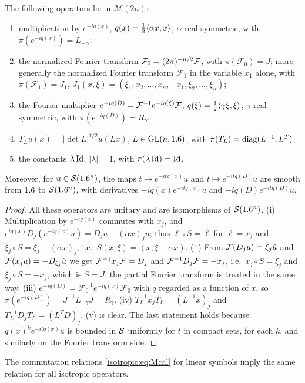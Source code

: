 \begin{lemma}\label{isotropic:lem:Mcal-examples}
The following operators lie in $\mathcal M(2n)$:
\begin{enumerate}[label=\textup{(\roman*)}]
\item multiplication by $e^{-iq(x)}$, $q(x)=\frac12\langle \alpha x, x\rangle$, $\alpha$
  real symmetric, with $\pi(e^{-iq(x)})=L_{-\alpha}$;
\item the normalized Fourier transform $\mathcal F_0=(2\pi)^{-n/2}\mathcal{F}$, with
  $\pi(\mathcal F_0)=J$; more generally the normalized Fourier transform
  $\mathcal F_1$ in the variable $x_1$ alone, with
  $\pi(\mathcal F_1)=J_1$, $J_1(x,\xi)=(\xi_1,x_2,\dots,x_n,-x_1,\xi_2,\dots,\xi_n)$;
\item the Fourier multiplier $e^{-iq(D)}=\mathcal{F}^{-1}e^{-iq(\xi)}\mathcal{F}$,
  $q(\xi)=\frac12\langle \gamma\xi, \xi\rangle$, $\gamma$ real symmetric, with
  $\pi(e^{-iq(D)})=R_\gamma$;
\item $T_Lu(x)=|\det L|^{1/2}u(Lx)$, $L\in\operatorname{GL}(n,1.6)$, with
  $\pi(T_L)=\operatorname{diag}(L^{-1},L^T)$;
\item the constants $\lambda\operatorname{Id}$, $|\lambda|=1$, with $\pi(\lambda\operatorname{Id})=\operatorname{Id}$.
\end{enumerate}
Moreover, for $u\in\mathcal{S}(1.6^n)$, the maps $t\mapsto e^{-itq(x)}u$ and
$t\mapsto e^{-itq(D)}u$ are smooth from $1.6$ to $\mathcal{S}(1.6^n)$, with derivatives
$-iq(x)e^{-itq(x)}u$ and $-iq(D)e^{-itq(D)}u$.
\end{lemma}
\begin{proof}
All these operators are unitary and are isomorphisms of $\mathcal{S}(1.6^n)$. (i)
Multiplication by $e^{-iq(x)}$ commutes with $x_j$, and
$e^{iq(x)}D_j(e^{-iq(x)}u)=D_ju-(\alpha x)_ju$; thus $\ell\circ S=\ell$ for
$\ell=x_j$ and $\xi_j\circ S=\xi_j-(\alpha x)_j$, i.e.\ $S(x,\xi)=(x,\xi-\alpha x)$.
(ii) From $\mathcal{F}(D_ju)=\xi_j\hat u$ and $\mathcal{F}(x_ju)=-D_{\xi_j}\hat u$ we get
$\mathcal{F}^{-1}x_j\mathcal{F}=D_j$ and $\mathcal{F}^{-1}D_j\mathcal{F}=-x_j$, i.e.\ $x_j\circ S=\xi_j$ and
$\xi_j\circ S=-x_j$, which is $S=J$; the partial Fourier transform is treated in
the same way. (iii) $e^{-iq(D)}=\mathcal F_0^{-1}e^{-iq(x)}\mathcal F_0$ with
$q$ regarded as a function of $x$, so $\pi(e^{-iq(D)})=J^{-1}L_{-\gamma}J=R_\gamma$.
(iv) $T_L^{-1}x_jT_L=(L^{-1}x)_j$ and $T_L^{-1}D_jT_L=(L^TD)_j$. (v) is clear.
The last statement holds because $q(x)^ke^{-itq(x)}u$ is bounded in $\mathcal{S}$
uniformly for $t$ in compact sets, for each $k$, and similarly on the Fourier
transform side.
\end{proof}

The commutation relations \eqref{isotropic:eq:Mcal} for linear symbols imply
the same relation for all isotropic operators.

